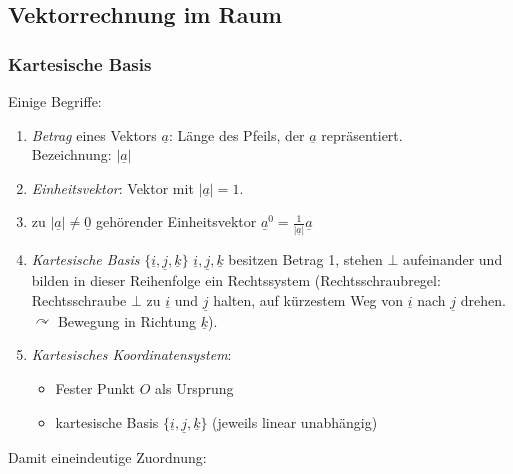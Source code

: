 \subsection{Vektorrechnung im Raum}
\subsubsection{Kartesische Basis}
Einige Begriffe:
\begin{enumerate}
\item \emph{Betrag} eines Vektors $\underline{a}$: Länge des Pfeils, der $\underline{a}$ repräsentiert.\\
Bezeichnung: $|\underline{a}|$
\item \emph{Einheitsvektor}: Vektor mit $|\underline{a}|=1$.
\item zu $|\underline{a}|\not =\underline{0}$ gehörender Einheitsvektor $\boxed{\underline{a}^0=\frac{1}{|\underline{a}|}\underline{a}}$
\item \emph{Kartesische Basis} $\{\underline{i}, \underline{j}, \underline{k}\}$ $\underline{i}, \underline{j}, \underline{k}$ besitzen Betrag 1, stehen $\bot$ aufeinander und bilden in dieser Reihenfolge ein Rechtssystem (Rechtsschraubregel: Rechtsschraube $\bot$ zu $\underline{i}$ und $\underline{j}$ halten, auf kürzestem Weg von $\underline{i}$ nach $\underline{j}$ drehen. $\curvearrowright$ Bewegung in Richtung $\underline{k}$).\\
\item \emph{Kartesisches Koordinatensystem}: 
\begin{itemize}
\item Fester Punkt $O$ als Ursprung
\item kartesische Basis $\{\underline{i}, \underline{j}, \underline{k}\}$ (jeweils linear unabhängig)
\end{itemize}
\end{enumerate}
Damit eineindeutige Zuordnung:\\
